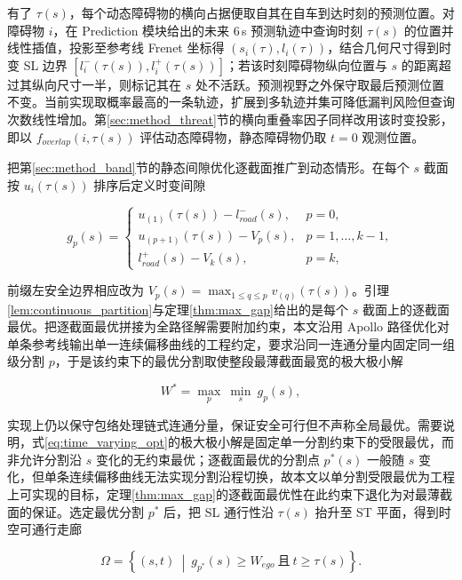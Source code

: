 \documentclass[a4paper,11pt]{ctexart}
\theoremstyle{definition}
\begin{document}
有了 $\tau(s)$，每个动态障碍物的横向占据便取自其在自车到达时刻的预测位置。对障碍物 $i$，在 Prediction 模块给出的未来 $6$\,s 预测轨迹中查询时刻 $\tau(s)$ 的位置并线性插值，投影至参考线 Frenet 坐标得 $(s_i(\tau), l_i(\tau))$，结合几何尺寸得到时变 SL 边界 $[l_i^{-}(\tau(s)), l_i^{+}(\tau(s))]$；若该时刻障碍物纵向位置与 $s$ 的距离超过其纵向尺寸一半，则标记其在 $s$ 处不活跃。预测视野之外保守取最后预测位置不变。当前实现取概率最高的一条轨迹，扩展到多轨迹并集可降低漏判风险但查询次数线性增加。第\ref{sec:method_threat}节的横向重叠率因子同样改用该时变投影，即以 $f_{overlap}(i, \tau(s))$ 评估动态障碍物，静态障碍物仍取 $t=0$ 观测位置。

把第\ref{sec:method_band}节的静态间隙优化逐截面推广到动态情形。在每个 $s$ 截面按 $u_i(\tau(s))$ 排序后定义时变间隙

\begin{equation}
    g_p(s) =
    \begin{cases}
        u_{(1)}(\tau(s)) - l_{road}^{-}(s), & p=0, \\[0.3em]
        u_{(p+1)}(\tau(s)) - V_p(s), & p=1,\ldots,k-1, \\[0.3em]
        l_{road}^{+}(s) - V_k(s), & p=k,
    \end{cases}
    \label{eq:time_varying_gap}
\end{equation}

前缀左安全边界相应改为 $V_p(s)=\max_{1\leq q\leq p} v_{(q)}(\tau(s))$。引理\ref{lem:continuous_partition}与定理\ref{thm:max_gap}给出的是每个 $s$ 截面上的逐截面最优。把逐截面最优拼接为全路径解需要附加约束，本文沿用 Apollo 路径优化对单条参考线输出单一连续偏移曲线的工程约定，要求沿同一连通分量内固定同一组级分割 $p$，于是该约束下的最优分割取使整段最薄截面最宽的极大极小解

\begin{equation}
    W^{*} = \max_{p}\ \min_{s}\ g_p(s),
    \label{eq:time_varying_opt}
\end{equation}

实现上仍以保守包络处理链式连通分量，保证安全可行但不声称全局最优。需要说明，式\eqref{eq:time_varying_opt}的极大极小解是固定单一分割约束下的受限最优，而非允许分割沿 $s$ 变化的无约束最优；逐截面最优的分割点 $p^{*}(s)$ 一般随 $s$ 变化，但单条连续偏移曲线无法实现分割沿程切换，故本文以单分割受限最优为工程上可实现的目标，定理\ref{thm:max_gap}的逐截面最优性在此约束下退化为对最薄截面的保证。选定最优分割 $p^{*}$ 后，把 SL 通行性沿 $\tau(s)$ 抬升至 ST 平面，得到时空可通行走廊

\begin{equation}
    \Omega = \left\{ (s,t) \ \middle|\ g_{p^{*}}(s) \geq W_{ego}\ \text{且}\ t \geq \tau(s) \right\}.
    \label{eq:st_corridor}
\end{equation}
\end{document}
